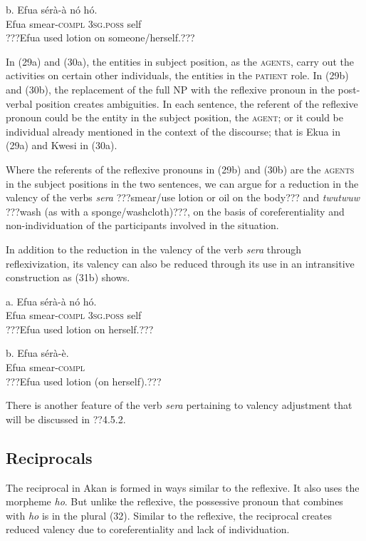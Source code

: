 \documentclass[output=paper]{langsci/langscibook}
\begin{document}
\ea
\gll  b.  Efua  sérà-à    nó    hó.\\
       Efua  smear-\textsc{compl}  \textsc{3sg.poss}  self\\
\glt   ???Efua used lotion on someone/herself.???
\z

In (29a) and (30a), the entities in subject position, as the \textsc{agents}, carry out the activities on certain other individuals, the entities in the \textsc{patient} role. In (29b) and (30b), the replacement of the full NP with the reflexive pronoun in the post-verbal position creates ambiguities. In each sentence, the referent of the reflexive pronoun could be the entity in the subject position, the \textsc{agent}; or it could be individual already mentioned in the context of the discourse; that is Ekua in (29a) and Kwesi in (30a).

Where the referents of the reflexive pronouns in (29b) and (30b) are the \textsc{agents} in the subject positions in the two sentences, we can argue for a reduction in the valency of the verbs \emph{sera} ???smear/use lotion or oil on the body??? and \emph{twutwuw} ???wash (as with a sponge/washcloth)???, on the basis of coreferentiality and non-individuation of the participants involved in the situation. 

In addition to the reduction in the valency of the verb \emph{sera} through reflexivization, its valency can also be reduced through its use in an intransitive construction as (31b) shows.

\ea
\gll a.  Efua  sérà-à    nó    hó.\\
       Efua  smear-\textsc{compl}  \textsc{3sg.poss}  self\\
\glt   ???Efua used lotion on herself.???
\z

\ea
\gll b.  Efua  sérà-è.\\
       Efua  smear-\textsc{compl}\\
\glt   ???Efua used lotion (on herself).???
\z

There is another feature of the verb \emph{sera} pertaining to valency adjustment that will be discussed in ??4.5.2.

\subsection{Reciprocals}

The reciprocal in Akan is formed in ways similar to the reflexive. It also uses the morpheme \emph{ho}. But unlike the reflexive, the possessive pronoun that combines with \emph{ho} is in the plural (32). Similar to the reflexive, the reciprocal creates reduced valency due to coreferentiality and lack of individuation.
\end{document}
